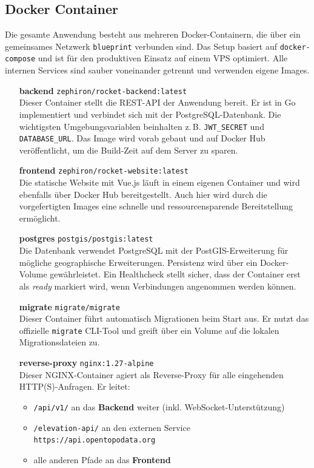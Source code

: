 \documentclass[11pt,a4paper]{article}
\begin{document}
\subsection{Docker Container}

Die gesamte Anwendung besteht aus mehreren Docker-Containern, die über ein gemeinsames Netzwerk \texttt{blueprint} verbunden sind. Das Setup basiert auf \texttt{docker-compose} und ist für den produktiven Einsatz auf einem VPS optimiert. Alle internen Services sind sauber voneinander getrennt und verwenden eigene Images.

\begin{itemize}
  \item[\textbf{backend}] \texttt{zephiron/rocket-backend:latest} \\
  Dieser Container stellt die REST-API der Anwendung bereit. Er ist in Go implementiert und verbindet sich mit der PostgreSQL-Datenbank. Die wichtigsten Umgebungsvariablen beinhalten z.\,B. \texttt{JWT\_SECRET} und \texttt{DATABASE\_URL}. Das Image wird vorab gebaut und auf Docker Hub veröffentlicht, um die Build-Zeit auf dem Server zu sparen.

  \item[\textbf{frontend}] \texttt{zephiron/rocket-website:latest} \\
  Die statische Website mit Vue.js läuft in einem eigenen Container und wird ebenfalls über Docker Hub bereitgestellt. Auch hier wird durch die vorgefertigten Images eine schnelle und ressourcensparende Bereitstellung ermöglicht.

  \item[\textbf{postgres}] \texttt{postgis/postgis:latest} \\
  Die Datenbank verwendet PostgreSQL mit der PostGIS-Erweiterung für mögliche geographische Erweiterungen. Persistenz wird über ein Docker-Volume gewährleistet. Ein Healthcheck stellt sicher, dass der Container erst als \textit{ready} markiert wird, wenn Verbindungen angenommen werden können.

  \item[\textbf{migrate}] \texttt{migrate/migrate} \\
  Dieser Container führt automatisch Migrationen beim Start aus. Er nutzt das offizielle \texttt{migrate} CLI-Tool und greift über ein Volume auf die lokalen Migrationsdateien zu.

  \item[\textbf{reverse-proxy}] \texttt{nginx:1.27-alpine} \\
  Dieser NGINX-Container agiert als Reverse-Proxy für alle eingehenden HTTP(S)-Anfragen. Er leitet:
  \begin{itemize}
    \item \texttt{/api/v1/} an das \textbf{Backend} weiter (inkl. WebSocket-Unterstützung)
    \item \texttt{/elevation-api/} an den externen Service \texttt{https://api.opentopodata.org}
    \item alle anderen Pfade an das \textbf{Frontend}
  \end{itemize}


\end{itemize}
\end{document}
